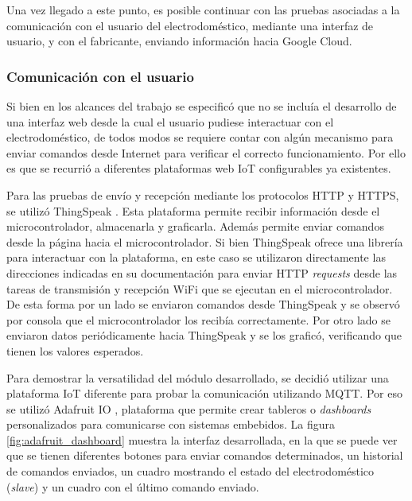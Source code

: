 Una vez llegado a este punto, es posible continuar con las pruebas asociadas a la comunicación con el usuario del electrodoméstico, mediante una interfaz de usuario, y con el fabricante, enviando información hacia Google Cloud.

\subsubsection{Comunicación con el usuario}

Si bien en los alcances del trabajo se especificó que no se incluía el desarrollo de una interfaz web desde la cual el usuario pudiese interactuar con el electrodoméstico, de todos modos se requiere contar con algún mecanismo para enviar comandos desde Internet para verificar el correcto funcionamiento. Por ello es que se recurrió a diferentes plataformas web IoT configurables ya existentes.

Para las pruebas de envío y recepción mediante los protocolos HTTP y HTTPS, se utilizó ThingSpeak \citep{thingspeak}. Esta plataforma permite recibir información desde el microcontrolador, almacenarla y graficarla. Además permite enviar comandos desde la página hacia el microcontrolador. Si bien ThingSpeak ofrece una librería para interactuar con la plataforma, en este caso se utilizaron directamente las direcciones indicadas en su documentación para enviar HTTP \emph{requests} desde las tareas de transmisión y recepción WiFi que se ejecutan en el microcontrolador. De esta forma por un lado se enviaron comandos desde ThingSpeak y se observó por consola que el microcontrolador los recibía correctamente. Por otro lado se enviaron datos periódicamente hacia ThingSpeak y se los graficó, verificando que tienen los valores esperados.

Para demostrar la versatilidad del módulo desarrollado, se decidió utilizar una plataforma IoT diferente para probar la comunicación utilizando MQTT. Por eso se utilizó Adafruit IO \citep{adafruit}, plataforma que permite crear tableros o \emph{dashboards} personalizados para comunicarse con sistemas embebidos. La figura \ref{fig:adafruit_dashboard} muestra la interfaz desarrollada, en la que se puede ver que se tienen diferentes botones para enviar comandos determinados, un historial de comandos enviados, un cuadro mostrando el estado del electrodoméstico (\emph{slave}) y un cuadro con el último comando enviado.

